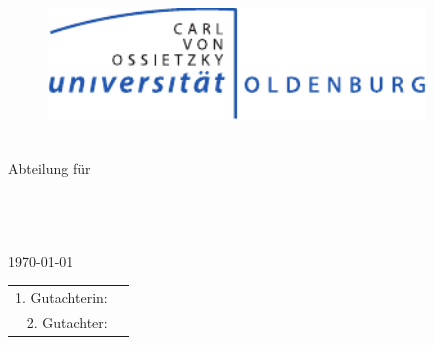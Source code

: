 \thispagestyle{empty}
\hoffset=0.4cm
\begin{center}
\begin{figure}
\centering
\includegraphics[width=10cm]{Abbildungen/uniol_4c}\\
\end{figure}
\vspace{2cm}
{\bf \Department}\\Abteilung für \Abteilung\\
\vspace{4cm}
{\bf \ArbeitTyp}\\
\vspace{.5cm}
{\begin{minipage}[t]{10cm}
\centering
\Large
\Titel
\end{minipage}}\\
\vspace{3cm}
\Name\\
\vspace{.5cm}
\today\\
\vspace{3cm}
\begin{tabular}{rl}
	1. Gutachterin: & \ErstGutachter\\[0.5ex]
	2. Gutachter: & \ZweitGutachter
\end{tabular}
\end{center}
